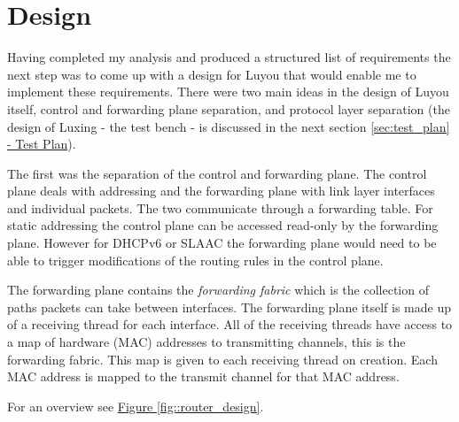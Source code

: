 \documentclass[12pt,a4paper,twoside,openany]{report}
\begin{document}
\section{Design}
\label{sec::design}

Having completed my analysis and produced a structured list of requirements the next step was to come up with a design for Luyou that would enable me to implement these requirements.  There were two main ideas in the design of Luyou itself, control and forwarding plane separation, and protocol layer separation (the design of Luxing - the test bench - is discussed in the next section \ref{sec:test_plan}\hyperref[sec::test_plan]{ - Test Plan}). 

\bigskip

The first was the separation of the control and forwarding plane. The control plane deals with addressing and the forwarding plane with link layer interfaces and individual packets.  The two communicate through a forwarding table. For static addressing the control plane can be accessed read-only by the forwarding plane. However for DHCPv6 or SLAAC the forwarding plane would need to be able to trigger modifications of the routing rules in the control plane. 

The forwarding plane contains the \textit{forwarding fabric} which is the collection of paths packets can take between interfaces. The forwarding plane itself is made up of a receiving thread for each interface. All of the receiving threads have access to a map of hardware (MAC) addresses to transmitting channels, this is the forwarding fabric. This map is given to each receiving thread on creation.  Each MAC address is mapped to the transmit channel for that MAC address. 

For an overview see \hyperref[fig::router_design]{Figure }\ref{fig::router_design}.
\end{document}

